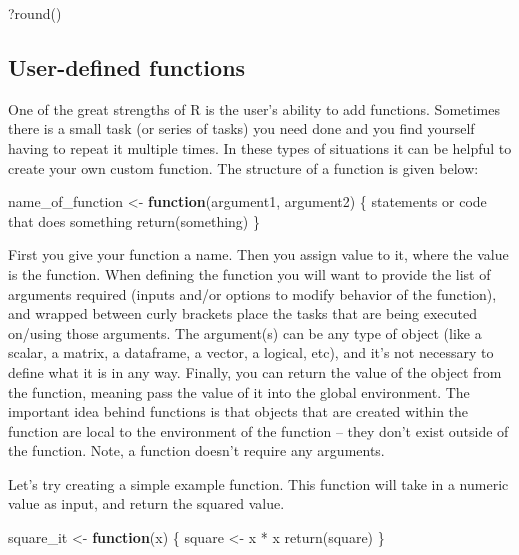 \documentclass[
  12pt,
  oneside]{book}
\newenvironment{Shaded}{\begin{snugshade}}{\end{snugshade}}
\newcommand{\ControlFlowTok}[1]{\textcolor[rgb]{0.13,0.29,0.53}{\textbf{#1}}}
\newcommand{\FunctionTok}[1]{\textcolor[rgb]{0.00,0.00,0.00}{#1}}
\newcommand{\NormalTok}[1]{#1}
\newcommand{\OtherTok}[1]{\textcolor[rgb]{0.56,0.35,0.01}{#1}}
\newcommand{\SpecialCharTok}[1]{\textcolor[rgb]{0.00,0.00,0.00}{#1}}
\begin{document}
\begin{Shaded}
\begin{Highlighting}[]
\NormalTok{?}\FunctionTok{round}\NormalTok{()}
\end{Highlighting}
\end{Shaded}

\hypertarget{sec:generics}{%
\subsection{User-defined functions}\label{sec:generics}}

One of the great strengths of R is the user's ability to add functions. Sometimes there is a small task (or series of tasks) you need done and you find yourself having to repeat it multiple times. In these types of situations it can be helpful to create your own custom function. The structure of a function is given below:

\begin{Shaded}
\begin{Highlighting}[]
\NormalTok{name\_of\_function }\OtherTok{\textless{}{-}} \ControlFlowTok{function}\NormalTok{(argument1, argument2) \{}
\NormalTok{    statements or code that does something}
    \FunctionTok{return}\NormalTok{(something)}
\NormalTok{\}}
\end{Highlighting}
\end{Shaded}

First you give your function a name.
Then you assign value to it, where the value is the function.
When defining the function you will want to provide the list of arguments required (inputs and/or options to modify behavior of the function), and wrapped between curly brackets place the tasks that are being executed on/using those arguments. The argument(s) can be any type of object (like a scalar, a matrix, a dataframe, a vector, a logical, etc), and it's not necessary to define what it is in any way.
Finally, you can return the value of the object from the function, meaning pass the value of it into the global environment. The important idea behind functions is that objects that are created within the function are local to the environment of the function -- they don't exist outside of the function. Note, a function doesn't require any arguments.

Let's try creating a simple example function. This function will take in a numeric value as input, and return the squared value.

\begin{Shaded}
\begin{Highlighting}[]
\NormalTok{square\_it }\OtherTok{\textless{}{-}} \ControlFlowTok{function}\NormalTok{(x) \{ }
\NormalTok{   square }\OtherTok{\textless{}{-}}\NormalTok{ x }\SpecialCharTok{*}\NormalTok{ x}
   \FunctionTok{return}\NormalTok{(square)}
\NormalTok{\} }
\end{Highlighting}
\end{Shaded}
\end{document}

